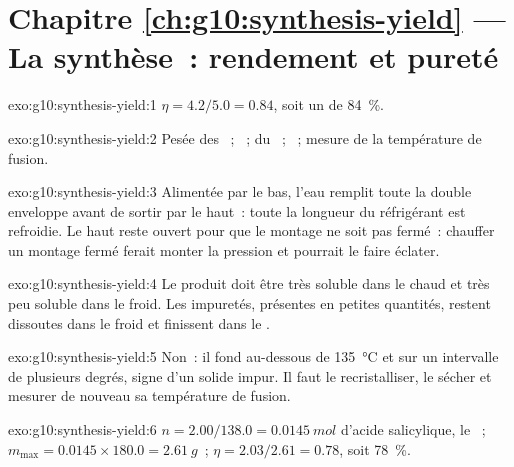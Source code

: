 \section*{Chapitre \ref{ch:g10:synthesis-yield} --- La synthèse~: rendement et pureté}

\begin{solution}{exo:g10:synthesis-yield:1}
$\eta = 4.2 / 5.0 = 0.84$, soit un  de \qty{84}{\percent}.
\end{solution}

\begin{solution}{exo:g10:synthesis-yield:2}
Pesée des ~; ~;  du
~; ~; mesure de la température de fusion.
\end{solution}

\begin{solution}{exo:g10:synthesis-yield:3}
Alimentée par le bas, l'eau remplit toute la double enveloppe avant de
sortir par le haut~: toute la longueur du réfrigérant est refroidie. Le
haut reste ouvert pour que le montage ne soit pas fermé~: chauffer un
montage fermé ferait monter la pression et pourrait le faire éclater.
\end{solution}

\begin{solution}{exo:g10:synthesis-yield:4}
Le produit doit être très soluble dans le  chaud et très peu
soluble dans le  froid. Les impuretés, présentes en petites
quantités, restent dissoutes dans le  froid et finissent dans le
.
\end{solution}

\begin{solution}{exo:g10:synthesis-yield:5}
Non~: il fond au-dessous de \qty{135}{\celsius} et sur un intervalle de
plusieurs degrés, signe d'un solide impur. Il faut le recristalliser, le
sécher et mesurer de nouveau sa température de fusion.
\end{solution}

\begin{solution}{exo:g10:synthesis-yield:6}
$n = 2.00 / 138.0 = \qty{0.0145}{mol}$ d'acide salicylique, le ~; $m_{\max} = 0.0145 \times 180.0 = \qty{2.61}{g}$~;
$\eta = 2.03 / 2.61 = 0.78$, soit \qty{78}{\percent}.
\end{solution}


